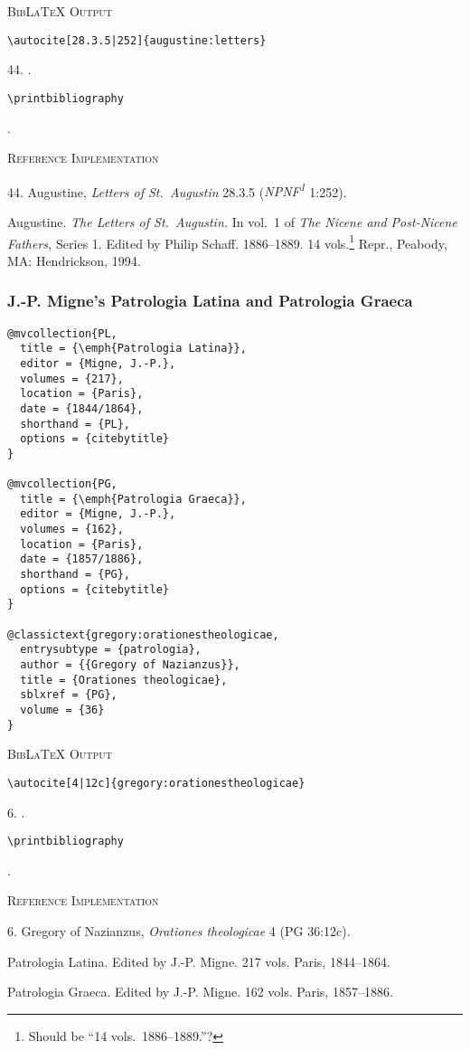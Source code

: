 \documentclass[a4paper]{article}
\newcommand\citetestns[3]{%
  {\textsc{BibLaTeX Output}\par
   \nobreak
   \texttt{\textbackslash autocite[#2]\{#3\}}\par
   \color{biblatex-colour}
   #1. \cite[#2]{#3}.\par
   \color{black}
   \texttt{\textbackslash printbibliography}\par
   \color{biblatex-colour}
   \sloppy\hangindent\bibindent\bibentrycite{#3}.\par}}
\newenvironment{refimp}{%
  \begin{minipage}{\linewidth}
    \setlength{\parskip}{1ex}
    \textsc{Reference Implementation}\par
    \nobreak
    \color{reference-colour}
}{\end{minipage}}
\begin{document}
\citetestns{44}{28.3.5|252}{augustine:letters}

\begin{refimp}
  44. Augustine, \emph{Letters of St.\ Augustin} 28.3.5
  (\emph{NPNF\textsuperscript{1}} 1:252).
  
  \hangindent\bibindent Augustine. \emph{The Letters of St.\ Augustin.} In
  vol.~1 of \emph{The Nicene and Post-Nicene Fathers,} Series 1. Edited by
  Philip Schaff. 1886–1889. 14 vols.\footnote{Should be “14 vols.\
  1886–1889.”?} Repr., Peabody, MA: Hendrickson, 1994.
\end{refimp}

\subsubsection{J.-P. Migne's Patrologia Latina and Patrologia Graeca}

\begin{lstlisting}
@mvcollection{PL,
  title = {\emph{Patrologia Latina}},
  editor = {Migne, J.-P.},
  volumes = {217},
  location = {Paris},
  date = {1844/1864},
  shorthand = {PL},
  options = {citebytitle}
}

@mvcollection{PG,
  title = {\emph{Patrologia Graeca}},
  editor = {Migne, J.-P.},
  volumes = {162},
  location = {Paris},
  date = {1857/1886},
  shorthand = {PG},
  options = {citebytitle}
}

@classictext{gregory:orationestheologicae,
  entrysubtype = {patrologia},
  author = {{Gregory of Nazianzus}},
  title = {Orationes theologicae},
  sblxref = {PG},
  volume = {36}
}
\end{lstlisting}

{\textsc{BibLaTeX Output}\par
  \nobreak
  \texttt{\textbackslash autocite[4|12c]\{gregory:orationestheologicae\}}\par
  \color{biblatex-colour}
  6. \cite[4|12c]{gregory:orationestheologicae}.\par
  \color{black}
  \texttt{\textbackslash printbibliography}\par
  \color{biblatex-colour}
  \hangindent\bibindent{}.\par
\hangindent\bibindent{}\par}

\begin{refimp}
  6. Gregory of Nazianzus, \emph{Orationes theologicae} 4 (PG 36:12c).

  \hangindent\bibindent Patrologia Latina. Edited by J.-P. Migne. 217 vols.
  Paris, 1844–1864.

  \hangindent\bibindent Patrologia Graeca. Edited by J.-P. Migne. 162 vols.
  Paris, 1857–1886.
\end{refimp}
\end{document}
